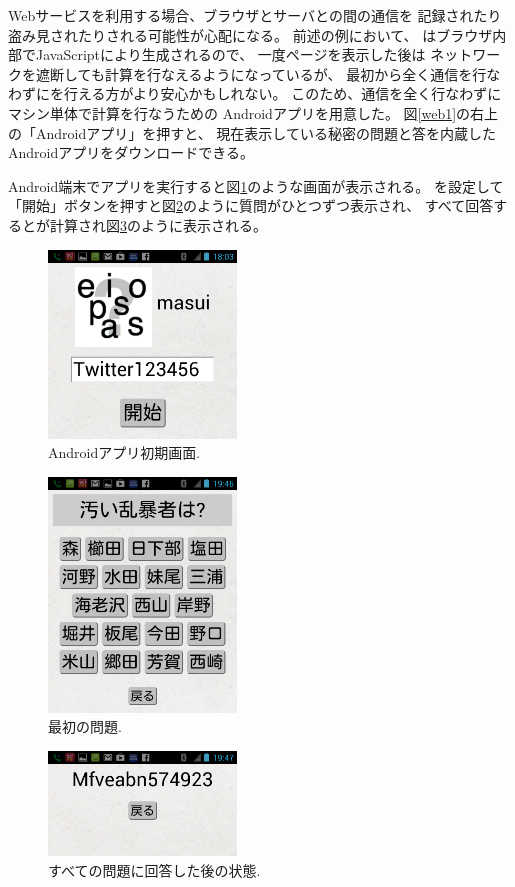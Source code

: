 \documentclass[twoside]{wiss}
\begin{document}
Webサービスを利用する場合、ブラウザとサーバとの間の通信を
記録されたり盗み見されたりされる可能性が心配になる。
前述の例において、
{\PW}はブラウザ内部でJavaScriptにより生成されるので、
一度ページを表示した後は
ネットワークを遮断しても{\PW}計算を行なえるようになっているが、
最初から全く通信を行なわずに{\PW}を行える方がより安心かもしれない。
このため、通信を全く行なわずにマシン単体で{\PW}計算を行なうための
Androidアプリを用意した。
図\ref{web1}の右上の「Androidアプリ」を押すと、
現在表示している秘密の問題と答を内蔵したAndroidアプリをダウンロードできる。

Android端末でアプリを実行すると図\ref{android1}のような画面が表示される。
{\SS}を設定して「開始」ボタンを押すと図\ref{android2}のように質問がひとつずつ表示され、
すべて回答すると{\PW}が計算され図\ref{android3}のように表示される。

\begin{figure}[H]
\centerline{\includegraphics[width=50mm,bb=0 0 720 720]{figures/android1crop.png}}
\caption{Androidアプリ初期画面.}
\label{android1}
\end{figure}

\begin{figure}[H]
\centerline{\includegraphics[width=50mm,bb=0 0 720 900]{figures/android2crop.png}}
\caption{最初の問題.}
\label{android2}
\end{figure}

\begin{figure}[H]
\centerline{\includegraphics[width=50mm,bb=0 0 720 400]{figures/android3crop.png}}
\caption{すべての問題に回答した後の状態.}
\label{android3}
\end{figure}
\end{document}
